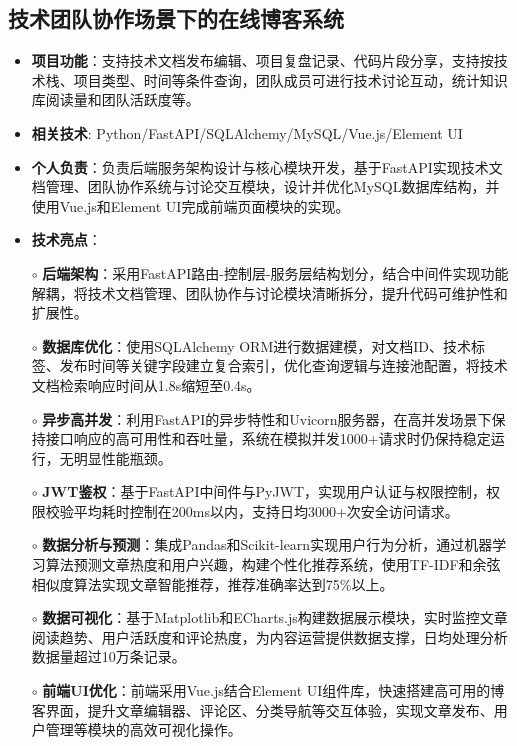 \subsection{\textbf{技术团队协作场景下的在线博客系统} \hspace{2cm}{2024.07 -- 2024.09}}
  \begin{normalsize}
    \begin{itemize}
    \item \textbf{项目功能}：支持技术文档发布编辑、项目复盘记录、代码片段分享，支持按技术栈、项目类型、时间等条件查询，团队成员可进行技术讨论互动，统计知识库阅读量和团队活跃度等。
    \item \textbf{相关技术}: Python/FastAPI/SQLAlchemy/MySQL/Vue.js/Element UI
    \item \textbf{个人负责}：负责后端服务架构设计与核心模块开发，基于FastAPI实现技术文档管理、团队协作系统与讨论交互模块，设计并优化MySQL数据库结构，并使用Vue.js和Element UI完成前端页面模块的实现。
    \item \textbf{技术亮点}：
    \setlength{\itemindent}{1em} %
      \item[$\circ$] \textbf{后端架构}：采用FastAPI路由-控制层-服务层结构划分，结合中间件实现功能解耦，将技术文档管理、团队协作与讨论模块清晰拆分，提升代码可维护性和扩展性。
      \item[$\circ$] \textbf{数据库优化}：使用SQLAlchemy ORM进行数据建模，对文档ID、技术标签、发布时间等关键字段建立复合索引，优化查询逻辑与连接池配置，将技术文档检索响应时间从1.8s缩短至0.4s。
      \item[$\circ$] \textbf{异步高并发}：利用FastAPI的异步特性和Uvicorn服务器，在高并发场景下保持接口响应的高可用性和吞吐量，系统在模拟并发1000+请求时仍保持稳定运行，无明显性能瓶颈。
      \item[$\circ$] \textbf{JWT鉴权}：基于FastAPI中间件与PyJWT，实现用户认证与权限控制，权限校验平均耗时控制在200ms以内，支持日均3000+次安全访问请求。
      \item[$\circ$] \textbf{数据分析与预测}：集成Pandas和Scikit-learn实现用户行为分析，通过机器学习算法预测文章热度和用户兴趣，构建个性化推荐系统，使用TF-IDF和余弦相似度算法实现文章智能推荐，推荐准确率达到75\%以上。
      \item[$\circ$] \textbf{数据可视化}：基于Matplotlib和ECharts.js构建数据展示模块，实时监控文章阅读趋势、用户活跃度和评论热度，为内容运营提供数据支撑，日均处理分析数据量超过10万条记录。
      \item[$\circ$] \textbf{前端UI优化}：前端采用Vue.js结合Element UI组件库，快速搭建高可用的博客界面，提升文章编辑器、评论区、分类导航等交互体验，实现文章发布、用户管理等模块的高效可视化操作。
    \end{itemize}
  \end{normalsize}